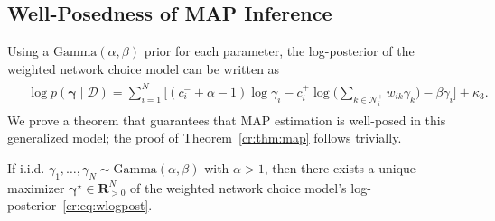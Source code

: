 \subsection{Well-Posedness of MAP Inference}

Using a $\text{Gamma}(\alpha, \beta)$ prior for each parameter, the log-posterior of the weighted network choice model can be written as
\begin{align}
\label{cr:eq:wlogpost}
\begin{aligned}
&\log p(\bm{\gamma} \mid \mathcal{D}) =
    \sum_{i = 1}^N \bigg[ (c^-_i + \alpha - 1) \log \gamma_i
        - c^+_i \log \bigg( \sum_{k \in \mathcal{N}^+_i} w_{ik} \gamma_k \bigg)  - \beta \gamma_i \bigg]
    + \kappa_3.
\end{aligned}
\end{align}
We prove a theorem that guarantees that MAP estimation is well-posed in this generalized model; the proof of Theorem~\ref{cr:thm:map} follows trivially.

\begin{theorem}
\label{cr:thm:wmap}
If i.i.d. $\gamma_1, \ldots, \gamma_N \sim \text{Gamma}(\alpha, \beta)$ with $\alpha > 1$, then there exists a unique maximizer $\bm{\gamma}^\star \in \mathbf{R}^N_{>0}$ of the weighted network choice model's log-posterior~\eqref{cr:eq:wlogpost}.
\end{theorem}

